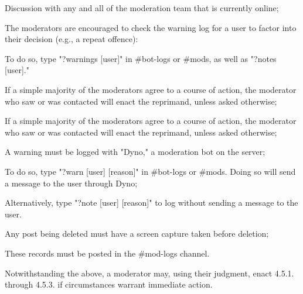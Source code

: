 \begin{longenum}[ label*=\thesubsection.\arabic*., align=left]
\begin{longenum}[label*=\arabic*., align=left]
			\begin{longenum}[label*=\arabic*., align=left]	
			\item Discussion with any and all of the moderation team that is currently online;
				\begin{longenum}[label*=\arabic*., align=left]
				\item The moderators are encouraged to check the warning log for a user to factor into their decision (e.g., a repeat offence):
					\begin{longenum}[label*=\arabic*., align=left]
					\item To do so, type "?warnings [user]" in \#bot-logs or \#mods, as well as "?notes [user]."
					\end{longenum}	
				\end{longenum}	
			\item If a simple majority of the moderators agree to a course of action, the moderator who saw or was contacted will enact the reprimand, unless asked otherwise;
				\begin{longenum}[label*=\arabic*., align=left]
				\item If a simple majority of the moderators agree to a course of action, the moderator who saw or was contacted will enact the reprimand, unless asked otherwise;
				\end{longenum}	
			\item A warning must be logged with "Dyno," a moderation bot on the server;
				\begin{longenum}[label*=\arabic*., align=left]
				\item To do so, type "?warn [user] [reason]" in \#bot-logs or \#mods. Doing so will send a message to the user through Dyno;
				\end{longenum}	
				\begin{longenum}[label*=\arabic*., align=left]
				\item Alternatively, type "?note [user] [reason]" to log without sending a message to the user.
				\end{longenum}	
			\item Any post being deleted must have a screen capture taken before deletion;
				\begin{longenum}[label*=\arabic*., align=left]
				\item These records must be posted in the \#mod-logs channel.
				\end{longenum}	
			\end{longenum}	
		\item Notwithstanding the above, a moderator may, using their judgment, enact 4.5.1. through 4.5.3. if circumstances warrant immediate action.

\end{longenum}
\end{longenum}
